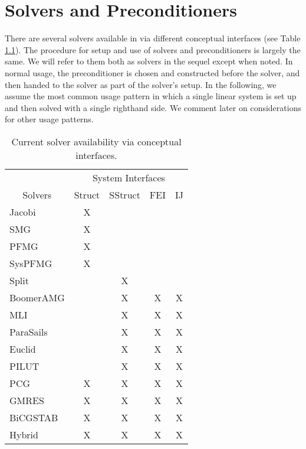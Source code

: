 
\chapter{Solvers and Preconditioners}
\label{ch-Solvers}

There are several solvers available in \hypre{} via different
conceptual interfaces (see Table \ref{table-solver-availability}).
The procedure for setup and use of solvers and preconditioners is
largely the same. We will refer to them both as solvers in the sequel
except when noted.  In normal usage, the preconditioner is chosen and
constructed before the solver, and then handed to the solver as part
of the solver's setup.  In the following, we assume the most common
usage pattern in which a single linear system is set up and then
solved with a single righthand side. We comment later on
considerations for other usage patterns.

\begin{table}[h]
\center
\begin{tabular}{|l||c|c|c|c|}
\hline
                               & \multicolumn{4}{|c|}{System Interfaces} \\
\multicolumn{1}{|c||}{Solvers} & Struct & SStruct & FEI & IJ \\
\hline\hline
Jacobi     & X &   &   &   \\
SMG        & X &   &   &   \\
PFMG       & X &   &   &   \\
SysPFMG    & X &   &   &   \\
Split      &   & X &   &   \\
BoomerAMG  &   & X & X & X \\
MLI        &   & X & X & X \\
ParaSails  &   & X & X & X \\
Euclid     &   & X & X & X \\
PILUT      &   & X & X & X \\
PCG        & X & X & X & X \\
GMRES      & X & X & X & X \\
BiCGSTAB   & X & X & X & X \\
Hybrid     & X & X & X & X \\
\hline
\end{tabular}
\caption{%
Current solver availability via \hypre{} conceptual interfaces.
}
\label{table-solver-availability}
\end{table}


